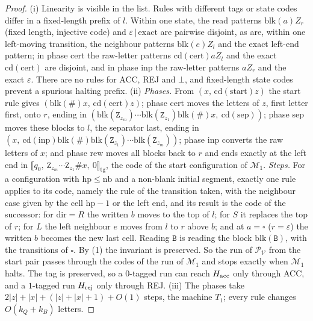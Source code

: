 \begin{proof}
(i) Linearity is visible in the list. Rules with different tags or state codes differ in a fixed-length prefix of $l$. Within one state, the read patterns $\mathrm{blk}(a)Z_r$ (fixed length, injective code) and $\varepsilon\,|\,\mathrm{exact}$ are pairwise disjoint, as are, within one left-moving transition, the neighbour patterns $\mathrm{blk}(e)Z_l$ and the exact left-end pattern; in phase cert the raw-letter patterns $\mathrm{cd}(\mathrm{cert})aZ_l$ and the exact $\mathrm{cd}(\mathrm{cert})$ are disjoint, and in phase inp the raw-letter patterns $aZ_r$ and the exact $\varepsilon$. There are no rules for ACC, REJ and $\bot$, and fixed-length state codes prevent a spurious halting prefix.
(ii) \emph{Phases.} From $(x,\,\mathrm{cd}(\mathrm{start})z)$ the start rule gives $(\mathrm{blk}(\#)x,\,\mathrm{cd}(\mathrm{cert})z)$; phase cert moves the letters of $z$, first letter first, onto $r$, ending in $(\mathrm{blk}(\mathtt Z_{z_m})\cdots\mathrm{blk}(\mathtt Z_{z_1})\mathrm{blk}(\#)x,\ \mathrm{cd}(\mathrm{sep}))$; phase sep moves these blocks to $l$, the separator last, ending in $(x,\ \mathrm{cd}(\mathrm{inp})\mathrm{blk}(\#)\mathrm{blk}(\mathtt Z_{z_1})\cdots\mathrm{blk}(\mathtt Z_{z_m}))$; phase inp converts the raw letters of $x$; and phase rew moves all blocks back to $r$ and ends exactly at the left end in $\llbracket q_0,\ \mathtt Z_{z_m}\cdots\mathtt Z_{z_1}\#x,\ 0\rrbracket_{\mathrm{tg}}$, the code of the start configuration of $\mathcal M_1$. \emph{Steps.} For a configuration with $\mathrm{hp}\le\mathrm{nb}$ and a non-blank initial segment, exactly one rule applies to its code, namely the rule of the transition taken, with the neighbour case given by the cell $\mathrm{hp}-1$ or the left end, and its result is the code of the successor: for $\mathrm{dir}=R$ the written $b$ moves to the top of $l$; for $S$ it replaces the top of $r$; for $L$ the left neighbour $e$ moves from $l$ to $r$ above $b$; and at $a=\square$ ($r=\varepsilon$) the written $b$ becomes the new last cell. Reading $\mathtt B$ is reading the block $\mathrm{blk}(\mathtt B)$, with the transitions of $\square$. By (1) the invariant is preserved. So the run of $\mathcal P_{\mathcal V}$ from the start pair passes through the codes of the run of $\mathcal M_1$ and stops exactly when $\mathcal M_1$ halts. The tag is preserved, so a $0$-tagged run can reach $H_{\rm acc}$ only through ACC, and a $1$-tagged run $H_{\rm rej}$ only through REJ.
(iii) The phases take $2\lvert z\rvert+\lvert x\rvert+(\lvert z\rvert+\lvert x\rvert+1)+O(1)$ steps, the machine $T_1$; every rule changes $O(k_Q+k_B)$ letters.
\end{proof}

